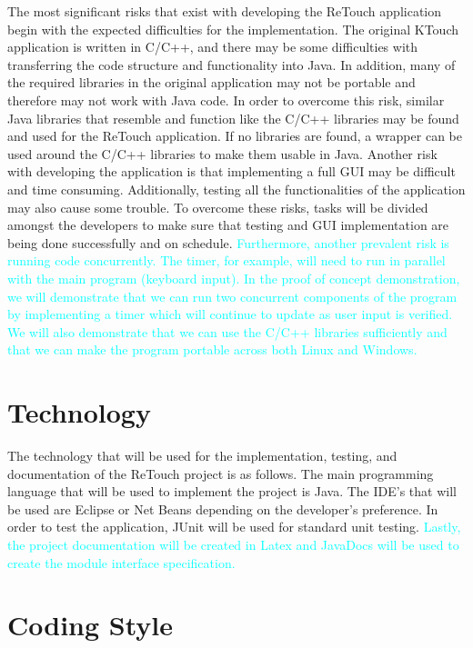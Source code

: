 \documentclass{article}
\begin{document}
    The most significant risks that exist with developing the ReTouch application begin with the expected difficulties for the implementation. The original KTouch application is written in C/C++, and there may be some difficulties with transferring the code structure and functionality into Java. In addition, many of the required libraries in the original application may not be portable and therefore may not work with Java code. In order to overcome this risk, similar Java libraries that resemble and function like the C/C++ libraries may be found and used for the ReTouch application. If no libraries are found, a wrapper can be used around the C/C++ libraries to make them usable in Java. Another risk with developing the application is that implementing a full GUI may be difficult and time consuming. Additionally, testing all the functionalities of the application may also cause some trouble. To overcome these risks, tasks will be divided amongst the developers to make sure that testing and GUI implementation are being done successfully and on schedule. \textcolor{cyan}{Furthermore, another prevalent risk is running code concurrently. The timer, for example, will need to run in parallel with the main program (keyboard input). In the proof of concept demonstration, we will demonstrate that we can run two concurrent components of the program by implementing a timer which will continue to update as user input is verified. We will also demonstrate that we can use the C/C++ libraries sufficiently and that we can make the program portable across both Linux and Windows.}


\section{Technology}

    The technology that will be used for the implementation, testing, and documentation of the ReTouch project is as follows. The main programming language that will be used to implement the project is Java. The IDE's that will be used are Eclipse or Net Beans depending on the developer's preference. In order to test the application, JUnit will be used for standard unit testing. \textcolor{cyan}{Lastly, the project documentation will be created in Latex and JavaDocs will be used to create the module interface specification.}

\section{Coding Style}
\end{document}
